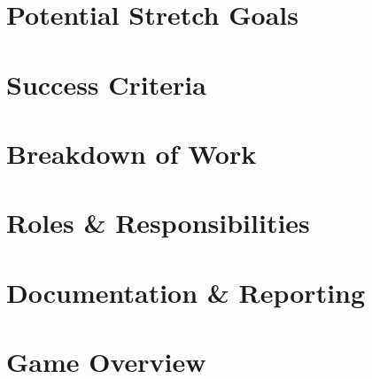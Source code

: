\section{Potential Stretch Goals}


\section{Success Criteria}

\newpage

\section{Breakdown of Work}


\section{Roles \& Responsibilities}


\section{Documentation \& Reporting}

\newpage

\section{Game Overview}

\newpage


